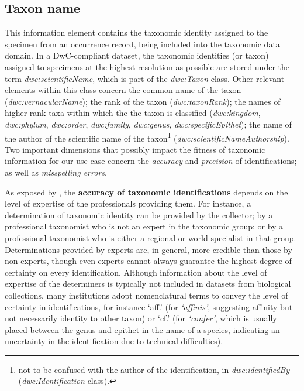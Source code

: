 
\subsection{Taxon name}
This information element contains the taxonomic identity assigned to the specimen from an occurrence record, being included into the taxonomic data domain.
In a DwC-compliant dataset, the taxonomic identities (or taxon) assigned to specimens at the highest resolution as possible are stored under the term \textit{dwc:scientificName}, which is part of the \textit{dwc:Taxon} class.
Other relevant elements within this class concern the common name of the taxon (\textit{dwc:vernacularName});
the rank of the taxon (\textit{dwc:taxonRank}); 
the names of higher-rank taxa within which the the taxon is classified (\textit{dwc:kingdom}, \textit{dwc:phylum}, \textit{dwc:order}, \textit{dwc:family}, \textit{dwc:genus}, \textit{dwc:specificEpithet});
the name of the author of the scientific name of the taxon\footnote{not to be confused with the author of the identification, in \textit{dwc:identifiedBy} (\textit{dwc:Identification} class).} (\textit{dwc:scientificNameAuthorship}).
%
Two important dimensions that possibly impact the fitness of taxonomic information for our use case concern the \textit{accuracy} and \textit{precision} of identifications; as well as \textit{misspelling errors}.

As exposed by , the \textbf{accuracy of taxonomic identifications} depends on the level of expertise of the professionals providing them.
For instance, a determination of taxonomic identity can be provided by the collector; by a professional taxonomist who is not an expert in the taxonomic group; or by a professional taxonomist who is either a regional or world specialist in that group.
Determinations provided by experts are, in general, more credible than those by non-experts, though even experts cannot always guarantee the highest degree of certainty on every identification.
Although information about the level of expertise of the determiners is typically not included in datasets from biological collections, many institutions adopt nomenclatural terms to convey the level of certainty in identifications, for instance `aff.' (for \textit{`affinis'}, suggesting affinity but not necessarily identity to other taxon) or `cf.' (for \textit{`confer'}, which is usually placed between the genus and epithet in the name of a species, indicating an uncertainty in the identification due to technical difficulties).

